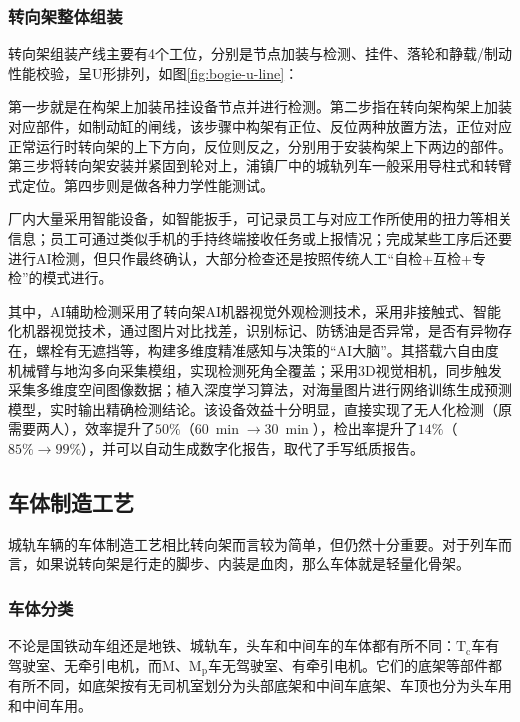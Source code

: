 \subsubsection{转向架整体组装}
转向架组装产线主要有4个工位，分别是节点加装与检测、挂件、落轮和静载/制动性能校验，呈U形排列，如图\ref{fig:bogie-u-line}：\par{}
第一步就是在构架上加装吊挂设备节点并进行检测。第二步指在转向架构架上加装对应部件，如制动缸的闸线，该步骤中构架有正位、反位两种放置方法，正位对应正常运行时转向架的上下方向，反位则反之，分别用于安装构架上下两边的部件。第三步将转向架安装并紧固到轮对上，浦镇厂中的城轨列车一般采用导柱式和转臂式定位。第四步则是做各种力学性能测试。\par{}
厂内大量采用智能设备，如智能扳手，可记录员工与对应工作所使用的扭力等相关信息；员工可通过类似手机的手持终端接收任务或上报情况；完成某些工序后还要进行AI检测，但只作最终确认，大部分检查还是按照传统人工“自检+互检+专检”的模式进行。\par{}
其中，AI辅助检测采用了转向架AI机器视觉外观检测技术，采用非接触式、智能化机器视觉技术，通过图片对比找差，识别标记、防锈油是否异常，是否有异物存在，螺栓有无遮挡等，构建多维度精准感知与决策的“AI大脑”。其搭载六自由度机械臂与地沟多向采集模组，实现检测死角全覆盖；采用3D视觉相机，同步触发采集多维度空间图像数据；植入深度学习算法，对海量图片进行网络训练生成预测模型，实时输出精确检测结论。该设备效益十分明显，直接实现了无人化检测（原需要两人），效率提升了$50\%$（$60~\min\to30~\min$），检出率提升了$14\%$（$85\%\to99\%$），并可以自动生成数字化报告，取代了手写纸质报告。\par{}

\subsection{车体制造工艺}
城轨车辆的车体制造工艺相比转向架而言较为简单，但仍然十分重要。对于列车而言，如果说转向架是行走的脚步、内装是血肉，那么车体就是轻量化骨架。\par{}

\subsubsection{车体分类}
不论是国铁动车组还是地铁、城轨车，头车和中间车的车体都有所不同：$\mathrm{T_c}$车有驾驶室、无牵引电机，而$\mathrm{M}$、$\mathrm{M_p}$车无驾驶室、有牵引电机。它们的底架等部件都有所不同，如底架按有无司机室划分为头部底架和中间车底架、车顶也分为头车用和中间车用。\par{}

